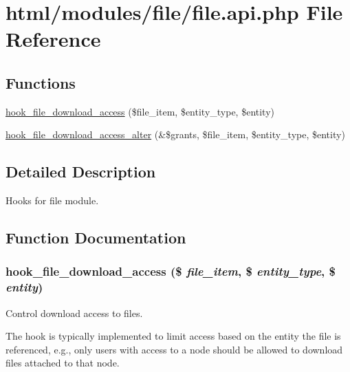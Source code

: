 \hypertarget{file_8api_8php}{
\section{html/modules/file/file.api.php File Reference}
\label{file_8api_8php}
}
\subsection*{Functions}
\begin{DoxyCompactItemize}
\item 
\hyperlink{file_8api_8php_ae72c8feceec1072762bffc3ba020aa2a}{hook\_\-file\_\-download\_\-access} (\$file\_\-item, \$entity\_\-type, \$entity)
\item 
\hyperlink{file_8api_8php_a7e22cfd274f391fcf170c4f1619921ab}{hook\_\-file\_\-download\_\-access\_\-alter} (\&\$grants, \$file\_\-item, \$entity\_\-type, \$entity)
\end{DoxyCompactItemize}


\subsection{Detailed Description}
Hooks for file module. 

\subsection{Function Documentation}
\hypertarget{file_8api_8php_ae72c8feceec1072762bffc3ba020aa2a}{
\subsubsection[{hook\_\-file\_\-download\_\-access}]{\setlength{\rightskip}{0pt plus 5cm}hook\_\-file\_\-download\_\-access (\$ {\em file\_\-item}, \/  \$ {\em entity\_\-type}, \/  \$ {\em entity})}}
\label{file_8api_8php_ae72c8feceec1072762bffc3ba020aa2a}
Control download access to files.

The hook is typically implemented to limit access based on the entity the file is referenced, e.g., only users with access to a node should be allowed to download files attached to that node.


